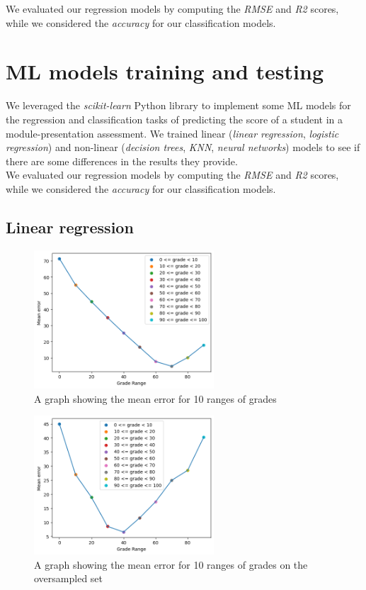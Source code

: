 \documentclass{article}
\begin{document}
We evaluated our regression models by computing the \textit{RMSE} and \textit{R2} scores, while we considered the \textit{accuracy} for our classification models.

\section{ML models training and testing}
We leveraged the \textit{scikit-learn} Python library to implement some ML models for the regression and classification tasks of predicting the score of a student in a module-presentation assessment. We trained linear (\textit{linear regression}, \textit{logistic regression}) and non-linear (\textit{decision trees}, \textit{KNN}, \textit{neural networks}) models to see if there are some differences in the results they provide.\\

We evaluated our regression models by computing the \textit{RMSE} and \textit{R2} scores, while we considered the \textit{accuracy} for our classification models.

\subsection{Linear regression}
\FloatBarrier

\begin{figure}[h]
    \centering
    \includegraphics[width=0.6\textwidth]{grades_errors.png}
    \caption{A graph showing the mean error for 10 ranges of grades}
    \label{fig:errorGraph}
\end{figure}

\begin{figure}[h]
    \centering
    \includegraphics[width=0.6\textwidth]{grades_errors2.png}
    \caption{A graph showing the mean error for 10 ranges of grades on the oversampled set}
    \label{fig:errorGraph2}
\end{figure}
\end{document}
